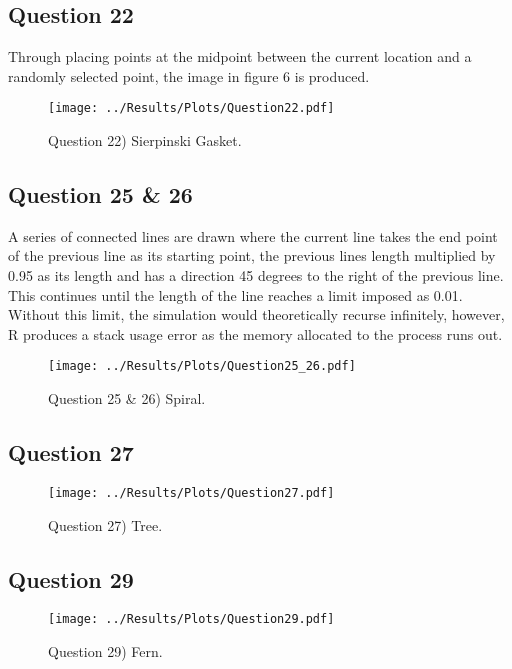 \documentclass[12pt]{article}
\begin{document}
    \subsection{Question 22}
    Through placing points at the midpoint between the current location and a randomly selected point, the image in figure 6 is produced.
    \begin{figure}[H]
    	\centering
    	\texttt{[image: ../Results/Plots/Question22.pdf]}
    	\caption{Question 22) Sierpinski Gasket.}
    \end{figure}
	
	\subsection{Question 25 \& 26}
	A series of connected lines are drawn where the current line takes the end point of the previous line as its starting point, the previous lines length multiplied by 0.95 as its length and has a direction 45 degrees to the right of the previous line. This continues until the length of the line reaches a limit imposed as 0.01. Without this limit, the simulation would theoretically recurse infinitely, however, R produces a stack usage error as the memory allocated to the process runs out.
	\begin{figure}[H]
		\centering
		\texttt{[image: ../Results/Plots/Question25\_26.pdf]}
		\caption{Question 25 \& 26) Spiral.}
	\end{figure}

	\subsection{Question 27}
	
	\begin{figure}[H]
		\centering
		\texttt{[image: ../Results/Plots/Question27.pdf]}
		\caption{Question 27) Tree.}
	\end{figure}

	\subsection{Question 29}
	\begin{figure}[H]
		\centering
		\texttt{[image: ../Results/Plots/Question29.pdf]}
		\caption{Question 29) Fern.}
	\end{figure}
    
    
\end{document}

